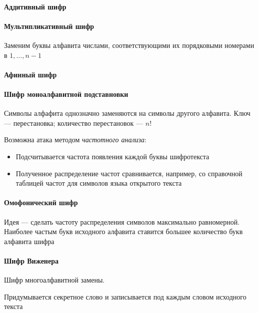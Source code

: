 \documentclass[a4paper, 14pt]{extarticle}
\begin{document}
\paragraph{Аддитивный шифр}

\paragraph{Мультипликативный шифр}
Заменим буквы алфавита числами, соответствующими их порядковыми номерами в $1,\ldots{}, n-1$

\paragraph{Афинный шифр}

\paragraph{Шифр моноалфавитной подставновки}
Символы алфафита однозначно заменяются на символы другого алфавита. Ключ --- перестановка; количество перестановок --- $ n! $


Возможна атака методом \textit{частотного анализа}:
\begin{itemize}
    \item Подсчитывается частота появления каждой буквы шифротекста
    \item Полученное распределение частот сравнивается, например, со справочной таблицей частот для символов языка открытого текста
\end{itemize}

\paragraph{Омофонический шифр}
Идея --- сделать частоту распределения символов максимально равномерной. Наиболее частым букв исходного алфавита ставится большее количество букв алфавита шифра

\paragraph{Шифр Виженера}
Шифр многоалфавитной замены.

Придумывается секретное слово и записывается под каждым словом исходного текста
\end{document}
